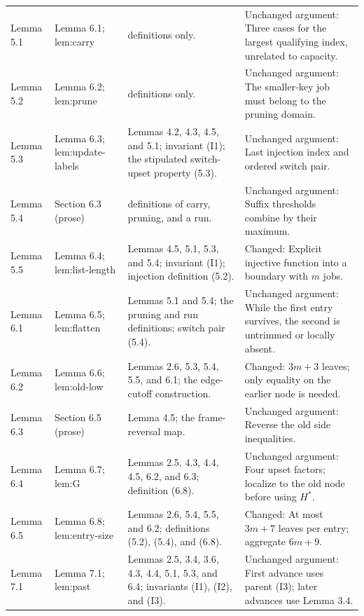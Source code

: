 \documentclass[11pt,a4paper]{article}
\theoremstyle{plain}
\theoremstyle{definition}
\begin{document}
{\begin{longtable}{@{}L{2.6cm}L{3.2cm}L{3.7cm}L{5.1cm}@{}}
Lemma 5.1 & Lemma 6.1; \textsf{lem:\allowbreak carry} & definitions only. & Unchanged argument: Three cases for the largest qualifying index, unrelated to capacity.\\[3pt]
Lemma 5.2 & Lemma 6.2; \textsf{lem:\allowbreak prune} & definitions only. & Unchanged argument: The smaller-key job must belong to the pruning domain.\\[3pt]
Lemma 5.3 & Lemma 6.3; \textsf{lem:\allowbreak update-\allowbreak labels} & Lemmas 4.2, 4.3, 4.5, and 5.1; invariant (I1); the stipulated switch-upset property (5.3). & Unchanged argument: Last injection index and ordered switch pair.\\[3pt]
Lemma 5.4 & Section 6.3 (prose) & definitions of carry, pruning, and a run. & Unchanged argument: Suffix thresholds combine by their maximum.\\[3pt]
Lemma 5.5 & Lemma 6.4; \textsf{lem:\allowbreak list-\allowbreak length} & Lemmas 4.5, 5.1, 5.3, and 5.4; invariant (I1); injection definition (5.2). & Changed: Explicit injective function into a boundary with \(m\) jobs.\\[3pt]
Lemma 6.1 & Lemma 6.5; \textsf{lem:\allowbreak flatten} & Lemmas 5.1 and 5.4; the pruning and run definitions; switch pair (5.4). & Unchanged argument: While the first entry survives, the second is untrimmed or locally absent.\\[3pt]
Lemma 6.2 & Lemma 6.6; \textsf{lem:\allowbreak old-\allowbreak low} & Lemmas 2.6, 5.3, 5.4, 5.5, and 6.1; the edge-cutoff construction. & Changed: \(3m+3\) leaves; only equality on the earlier node is needed.\\[3pt]
Lemma 6.3 & Section 6.5 (prose) & Lemma 4.5; the frame-reversal map. & Unchanged argument: Reverse the old side inequalities.\\[3pt]
Lemma 6.4 & Lemma 6.7; \textsf{lem:\allowbreak G} & Lemmas 2.5, 4.3, 4.4, 4.5, 6.2, and 6.3; definition (6.8). & Unchanged argument: Four upset factors; localize to the old node before using \(H^*\).\\[3pt]
Lemma 6.5 & Lemma 6.8; \textsf{lem:\allowbreak entry-\allowbreak size} & Lemmas 2.6, 5.4, 5.5, and 6.2; definitions (5.2), (5.4), and (6.8). & Changed: At most \(3m+7\) leaves per entry; aggregate \(6m+9\).\\[3pt]
Lemma 7.1 & Lemma 7.1; \textsf{lem:\allowbreak past} & Lemmas 2.5, 3.4, 3.6, 4.3, 4.4, 5.1, 5.3, and 6.4; invariants (I1), (I2), and (I3). & Unchanged argument: First advance uses parent (I3); later advances use Lemma 3.4.\\[3pt]

\end{longtable}}
\end{document}
